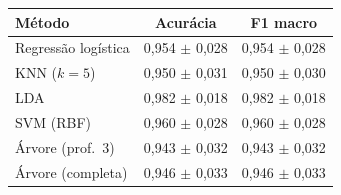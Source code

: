 \begin{tabular}{@{}lcc@{}}
\toprule
Método & Acurácia & F1 macro \\
\midrule
Regressão logística & 0,954 $\pm$ 0,028 & 0,954 $\pm$ 0,028 \\
KNN ($k=5$) & 0,950 $\pm$ 0,031 & 0,950 $\pm$ 0,030 \\
LDA & 0,982 $\pm$ 0,018 & 0,982 $\pm$ 0,018 \\
SVM (RBF) & 0,960 $\pm$ 0,028 & 0,960 $\pm$ 0,028 \\
Árvore (prof.\ 3) & 0,943 $\pm$ 0,032 & 0,943 $\pm$ 0,032 \\
Árvore (completa) & 0,946 $\pm$ 0,033 & 0,946 $\pm$ 0,033 \\
\bottomrule
\end{tabular}

